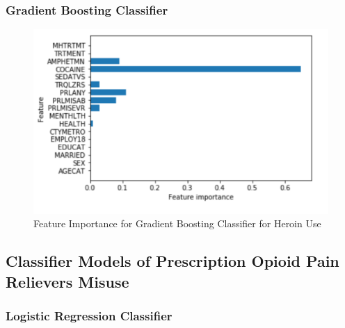 \documentclass[sigconf]{acmart}
\begin{document}
\subsubsection{Gradient Boosting Classifier}


\begin{figure}[!ht]
  \centering\includegraphics[width=\columnwidth]{images/Figure8.pdf}
  \caption{Feature Importance for Gradient Boosting Classifier for Heroin Use}
  \label{f:Figure8}
\end{figure}



\subsection{Classifier Models of Prescription Opioid Pain Relievers Misuse}

\subsubsection{Logistic Regression Classifier}


\cite{classifyPRL}
\end{document}
